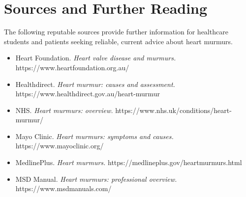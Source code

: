 \section*{Sources and Further Reading}
The following reputable sources provide further information for healthcare students and patients seeking reliable, current advice about heart murmurs.

\begin{itemize}
    \item Heart Foundation. \textit{Heart valve disease and murmurs.} https://www.heartfoundation.org.au/
    \item Healthdirect. \textit{Heart murmur: causes and assessment.} https://www.healthdirect.gov.au/heart-murmur
    \item NHS. \textit{Heart murmurs: overview.} https://www.nhs.uk/conditions/heart-murmur/
    \item Mayo Clinic. \textit{Heart murmurs: symptoms and causes.} https://www.mayoclinic.org/
    \item MedlinePlus. \textit{Heart murmurs.} https://medlineplus.gov/heartmurmurs.html
    \item MSD Manual. \textit{Heart murmurs: professional overview.} https://www.msdmanuals.com/
\end{itemize}
